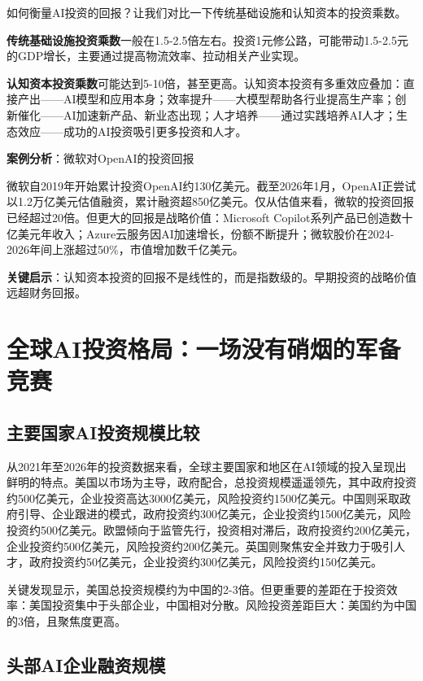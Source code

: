 如何衡量AI投资的回报？让我们对比一下传统基础设施和认知资本的投资乘数。

\textbf{传统基础设施投资乘数}一般在1.5-2.5倍左右。投资1元修公路，可能带动1.5-2.5元的GDP增长，主要通过提高物流效率、拉动相关产业实现。

\textbf{认知资本投资乘数}可能达到5-10倍，甚至更高。认知资本投资有多重效应叠加：直接产出——AI模型和应用本身；效率提升——大模型帮助各行业提高生产率；创新催化——AI加速新产品、新业态出现；人才培养——通过实践培养AI人才；生态效应——成功的AI投资吸引更多投资和人才。

\textbf{案例分析}：微软对OpenAI的投资回报

微软自2019年开始累计投资OpenAI约130亿美元。截至2026年1月，OpenAI正尝试以1.2万亿美元估值融资，累计融资超850亿美元。仅从估值来看，微软的投资回报已经超过20倍。但更大的回报是战略价值：Microsoft Copilot系列产品已创造数十亿美元年收入；Azure云服务因AI加速增长，份额不断提升；微软股价在2024-2026年间上涨超过50\%，市值增加数千亿美元。

\textbf{关键启示}：认知资本投资的回报不是线性的，而是指数级的。早期投资的战略价值远超财务回报。

\section{全球AI投资格局：一场没有硝烟的军备竞赛}

\subsection{主要国家AI投资规模比较}

从2021年至2026年的投资数据来看，全球主要国家和地区在AI领域的投入呈现出鲜明的特点。美国以市场为主导，政府配合，总投资规模遥遥领先，其中政府投资约500亿美元，企业投资高达3000亿美元，风险投资约1500亿美元。中国则采取政府引导、企业跟进的模式，政府投资约300亿美元，企业投资约1500亿美元，风险投资约500亿美元。欧盟倾向于监管先行，投资相对滞后，政府投资约200亿美元，企业投资约500亿美元，风险投资约200亿美元。英国则聚焦安全并致力于吸引人才，政府投资约50亿美元，企业投资约300亿美元，风险投资约150亿美元。

关键发现显示，美国总投资规模约为中国的2-3倍。但更重要的差距在于投资效率：美国投资集中于头部企业，中国相对分散。风险投资差距巨大：美国约为中国的3倍，且聚焦度更高。

\subsection{头部AI企业融资规模}

